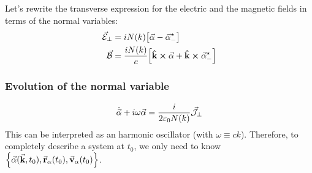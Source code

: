 Let's rewrite the transverse expression for the electric and the magnetic fields in terms of the normal variables:
\begin{subequations}
\begin{align}
	{\va{\mathcal{E}}}_{\perp} &= i N(k) \qty[ \va{\alpha} - \va{\alpha}_{-}^{\star}{} ] \\
	\va{\mathcal{B}} &= \frac{i N(k)}{c} \qty[ \vu{k} \cross \va{\alpha} + \vu{k} \cross \va{\alpha}_{-}^{\star}{} ]
\end{align}
\end{subequations}

\subsubsection*{Evolution of the normal variable}
\begin{align}
	\dot{\va{\alpha}} + i \omega \va{\alpha} = \dfrac{i}{2 \varepsilon_{0} N(k)} {\va{\mathcal{J}}}_{\perp}
\end{align}
This can be interpreted as an harmonic oscillator (with $\omega \equiv ck$). Therefore, to completely describe a system at $t_{0}$, we only need to know $\qty{\va{\alpha}(\va{k}, t_{0}), \va{r}_{\alpha}(t_{0}), \va{v}_{\alpha}(t_{0})}$.

